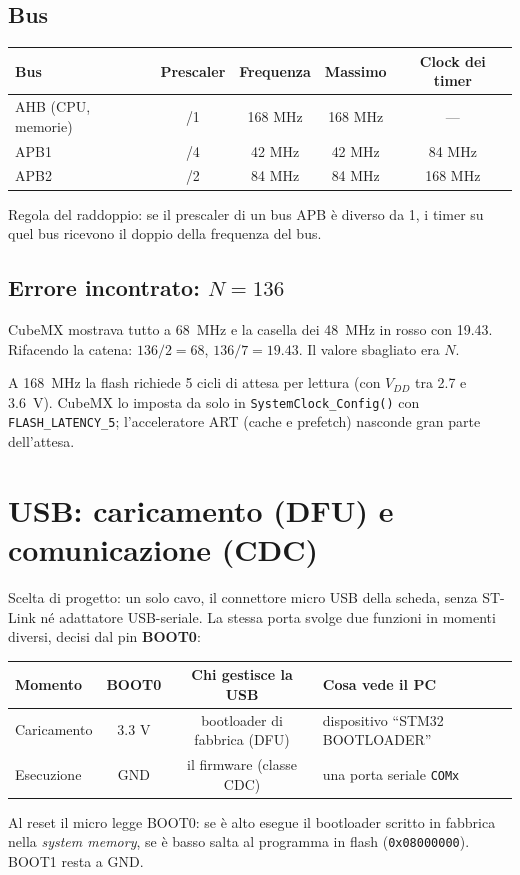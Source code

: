 \documentclass[11pt,a4paper]{article}
\newcommand{\code}[1]{\texttt{\small #1}}
\begin{document}
\subsection{Bus}
\begin{center}
\begin{tabular}{@{}lcccc@{}}
\toprule
Bus & Prescaler & Frequenza & Massimo & Clock dei timer\\
\midrule
AHB (CPU, memorie) & /1 & 168 MHz & 168 MHz & ---\\
APB1 & /4 & 42 MHz & 42 MHz & 84 MHz\\
APB2 & /2 & 84 MHz & 84 MHz & 168 MHz\\
\bottomrule
\end{tabular}
\end{center}
Regola del raddoppio: se il prescaler di un bus APB è diverso da 1, i timer su quel bus ricevono
il doppio della frequenza del bus.

\subsection{Errore incontrato: \texorpdfstring{$N = 136$}{N = 136}}
CubeMX mostrava tutto a 68~MHz e la casella dei 48~MHz in rosso con 19.43. Rifacendo la catena:
$136/2 = 68$, $136/7 = 19.43$. Il valore sbagliato era $N$.

\begin{nota}
A 168~MHz la flash richiede 5 cicli di attesa per lettura (con $V_{DD}$ tra 2.7 e 3.6~V).
CubeMX lo imposta da solo in \code{SystemClock\_Config()} con \code{FLASH\_LATENCY\_5};
l'acceleratore ART (cache e prefetch) nasconde gran parte dell'attesa.
\end{nota}

\section{USB: caricamento (DFU) e comunicazione (CDC)}

Scelta di progetto: un solo cavo, il connettore micro USB della scheda, senza ST-Link né adattatore
USB-seriale. La stessa porta svolge due funzioni in momenti diversi, decisi dal pin \textbf{BOOT0}:
\begin{center}
\begin{tabularx}{\textwidth}{@{}lccX@{}}
\toprule
Momento & BOOT0 & Chi gestisce la USB & Cosa vede il PC\\
\midrule
Caricamento & 3.3 V & bootloader di fabbrica (DFU) & dispositivo ``STM32 BOOTLOADER''\\
Esecuzione  & GND   & il firmware (classe CDC)     & una porta seriale \code{COMx}\\
\bottomrule
\end{tabularx}
\end{center}
Al reset il micro legge BOOT0: se è alto esegue il bootloader scritto in fabbrica nella
\emph{system memory}, se è basso salta al programma in flash (\code{0x08000000}). BOOT1 resta a GND.
\end{document}
